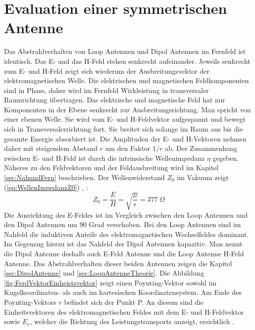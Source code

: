 
\newpage
\chapter{Evaluation einer symmetrischen Antenne}

Das Abstrahlverhalten von Loop Antennen und Dipol Antennen im Fernfeld ist identisch. Das E- und das H-Feld stehen senkrecht aufeinander. Jeweils senkrecht zum E- und H-Feld zeigt sich wiederum der Ausbreitungsvektor der elektromagnetischen Welle. Die elektrischen und magnetischen Feldkomponenten sind in Phase, daher wird im Fernfeld Wirkleistung in transversaler Raumrichtung
übertragen. Das elektrische und magnetische Feld hat nur Komponenten in der Ebene senkrecht zur Ausbreitungsrichtung. Man spricht von einer ebenen Welle. Sie wird vom E- und H-Feldvektor aufgespannt und bewegt sich in
Transversalerrichtung fort. Sie breitet sich solange im Raum aus bis die gesamte Energie absorbiert ist. Die Amplituden der E- und H-Vektoren nehmen daher mit steigendem Abstand $r$ um den Faktor $1/r$ ab. Der Zusammenhang zwischen E- und H-Feld ist durch die intrinsische Wellenimpedanz $\eta$ gegeben. Näheres zu den Feldvektoren und der Feldausbreitung wird im Kapitel \ref{sec:NahundFern} beschrieben. Der Wellenwiderstand $Z_0$ im Vakuum zeigt (\ref{eq:WellenImpedanzZ0}) \cite{Harrington-TimeHarmonic}, \cite{Emant}:
\begin{equation}\label{eq:WellenImpedanzZ0}
Z_{0}=\dfrac{E}{H}=\sqrt{\dfrac{\mu}{\epsilon}}=377\ \Omega
\end{equation}
Die Ausrichtung des E-Feldes ist im Vergleich zwischen den Loop Antennen und den Dipol Antennen um 90 Grad verschoben. Bei den Loop Antennen sind im Nahfeld die induktiven Anteile des elektromagnetischen Wechselfeldes dominant. Im Gegenzug hierzu ist das Nahfeld der Dipol Antennen kapazitiv. Man nennt die Dipol Antenne deshalb auch E-Feld Antenne und die Loop Antenne H-Feld Antenne. Das Abstrahlverhalten dieser beiden Antennen zeigen die Kapitel \ref{sec:DipolAntenne} und \ref{sec:LoopAntenneTheorie}. Die Abbildung \ref{fig:FerdVektorEinheistsvektor} zeigt einen Poynting-Vektor sowohl im Kugelkoordinaten- als auch im kartesischen Koordinatensystem. Am Ende des Poynting-Vektors $r$ befindet sich der Punkt P. An diesem sind die Einheitsvektoren des elektromagnetischen Feldes mit dem E- und H-Feldvektor sowie ${E}_r$, welcher die Richtung des Leistungstransports anzeigt, ersichtlich \cite{Emant}. \\

